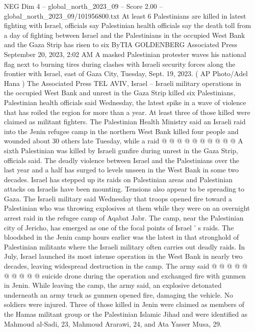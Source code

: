 \begin{textsample}{NEG Dim 4 – global\_north\_2023\_09 – Score 2.00 – global\_north\_2023\_09/101956800.txt}  \label{ex:f4_neg_046}
At least 6 Palestinians are killed in latest fighting with Israel, officials say Palestinian health officials say the death toll from a day of fighting between Israel and the Palestinians in the occupied West Bank and the Gaza Strip has risen to six ByTIA GOLDENBERG Associated Press September 20, 2023, 2:02 AM A masked Palestinian protester waves his national flag next to burning tires during clashes with Israeli security forces along the frontier with Israel, east of Gaza City, Tuesday, Sept. 19, 2023. ( AP Photo/Adel Hana ) The Associated Press TEL AVIV, Israel -- Israeli military operations in the occupied West Bank and unrest in the Gaza Strip killed six Palestinians, Palestinian health officials said Wednesday, the latest spike in a wave of violence that has roiled the region for more than a year.
At least three of those killed were claimed as militant fighters.
The Palestinian Health Ministry said an Israeli raid into the Jenin refugee camp in the northern West Bank killed four people and wounded about 30 others late Tuesday, while a raid @ @ @ @ @ @ @ @ @ @ A sixth Palestinian was killed by Israeli gunfire during unrest in the Gaza Strip, officials said.
The deadly violence between Israel and the Palestinians over the last year and a half has surged to levels unseen in the West Bank in some two decades.
Israel has stepped up its raids on Palestinian areas and Palestinian attacks on Israelis have been mounting.
Tensions also appear to be spreading to Gaza.
The Israeli military said Wednesday that troops opened fire toward a Palestinian who was throwing explosives at them while they were on an overnight arrest raid in the refugee camp of Aqabat Jabr.
The camp, near the Palestinian city of Jericho, has emerged as one of the focal points of Israel ' s raids.
The bloodshed in the Jenin camp hours earlier was the latest in that stronghold of Palestinian militants where the Israeli military often carries out deadly raids.
In July, Israel launched its most intense operation in the West Bank in nearly two decades, leaving widespread destruction in the camp.
The army said @ @ @ @ @ @ @ @ @ @ suicide drone during the operation and exchanged fire with gunmen in Jenin.
While leaving the camp, the army said, an explosive detonated underneath an army truck as gunmen opened fire, damaging the vehicle.
No soldiers were injured.
Three of those killed in Jenin were claimed as members of the Hamas militant group or the Palestinian Islamic Jihad and were identified as Mahmoud al-Sadi, 23, Mahmoud Ararawi, 24, and Ata Yasser Musa, 29.

\end{textsample}
